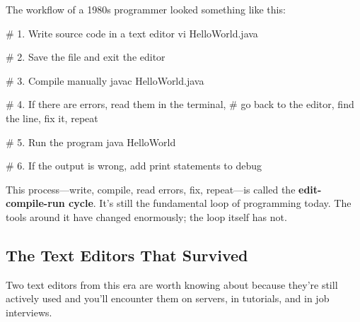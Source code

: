 \documentclass[11pt,letterpaper]{article}
\newcommand{\keyterm}[1]{\textbf{\textcolor{cssecondary}{#1}}}
\begin{document}
The workflow of a 1980s programmer looked something like this:

\begin{bashcode}
# 1. Write source code in a text editor
vi HelloWorld.java

# 2. Save the file and exit the editor

# 3. Compile manually
javac HelloWorld.java

# 4. If there are errors, read them in the terminal,
#    go back to the editor, find the line, fix it, repeat

# 5. Run the program
java HelloWorld

# 6. If the output is wrong, add print statements to debug
\end{bashcode}

This process---write, compile, read errors, fix, repeat---is called the \keyterm{edit-compile-run cycle}. It's still the fundamental loop of programming today. The tools around it have changed enormously; the loop itself has not.

\subsection{The Text Editors That Survived}

Two text editors from this era are worth knowing about because they're still actively used and you'll encounter them on servers, in tutorials, and in job interviews.

\begin{center}
\end{center}
\end{document}
